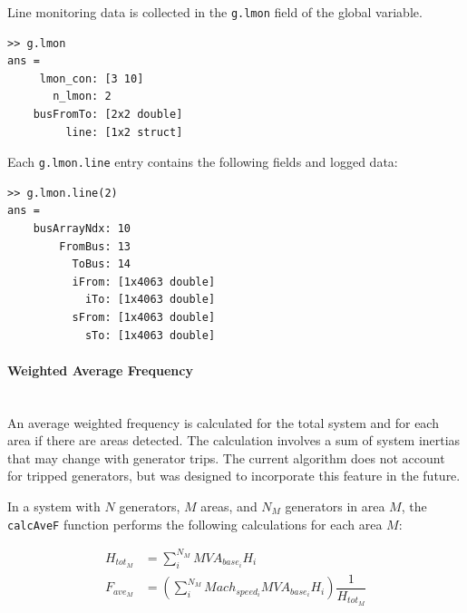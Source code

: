 \documentclass[12pt]{article}
\begin{document}
Line monitoring data is collected in the \verb|g.lmon| field of the global variable.

\begin{verbatim}
>> g.lmon
ans = 
     lmon_con: [3 10]
       n_lmon: 2
    busFromTo: [2x2 double]
         line: [1x2 struct]
\end{verbatim}

Each \verb|g.lmon.line| entry contains the following fields and logged data:

\begin{verbatim}
>> g.lmon.line(2)
ans = 
    busArrayNdx: 10
        FromBus: 13
          ToBus: 14
          iFrom: [1x4063 double]
            iTo: [1x4063 double]
          sFrom: [1x4063 double]
            sTo: [1x4063 double]
\end{verbatim}

\pagebreak
\paragraph{Weighted Average Frequency} \ \\
An average weighted frequency is calculated for the total system and for each area if there are areas detected.
The calculation involves a sum of system inertias that may change with generator trips.
The current algorithm does not account for tripped generators, but was designed to incorporate this feature in the future.

In a system with $N$ generators, $M$ areas, and $N_M$ generators in area $M$, the \verb|calcAveF| function performs the following calculations for each area $M$:

\begin{align*}
%             
%         
H_{tot_M} &= \sum_{i}^{N_M} MVA_{base_i}H_i \\
F_{ave_M} &= \left( \sum_{i}^{N_M}Mach_{speed_i}MVA_{base_i}H_i \right) \dfrac{1}{H_{tot_M}}
\end{align*}
\end{document}
